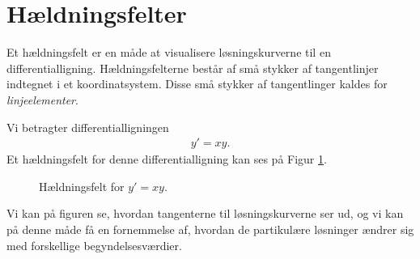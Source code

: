 \section*{Hældningsfelter}
Et hældningsfelt er en måde at visualisere løsningskurverne til en differentialligning. Hældningsfelterne består af små stykker af tangentlinjer indtegnet i et koordinatsystem. Disse små stykker af tangentlinger kaldes for \textit{linjeelementer}.
\begin{exa}
	Vi betragter differentialligningen
	\begin{align*}
		y' = xy.
	\end{align*}
	Et hældningsfelt for denne differentialligning kan ses på Figur \ref{fig:hel1}.
	\begin{figure}[H]
	\centering
	\caption{Hældningsfelt for $y' = xy$.}
	\label{fig:hel1}
	\end{figure}
	Vi kan på figuren se, hvordan tangenterne til løsningskurverne ser ud, og vi kan på denne måde få en fornemmelse af, hvordan de partikulære løsninger ændrer sig med forskellige begyndelsesværdier. 
\end{exa}


